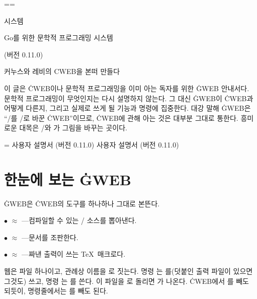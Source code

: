 \def\bull{\smallskip\item{$\bullet$}}

\def\begincode{\par\medskip\begingroup
  \def\do##1{\catcode`##1=12 }\dospecials
  \catcode`\|=0
  \obeylines \obeyspaces \tt \parindent=0pt \leftskip=\parindent\relax}
\def\endcode{\endgroup\medskip\noindent}

\def\runninghead{{\ninett GWEB} 사용자 설명서 (버전 0.11.0)}
\def\lheader{\mainfont\folio\hfil{\eightrm\eightgt\runninghead}\hfil}
\def\rheader{\hfil{\eightrm\eightgt\runninghead}\hfil\mainfont\folio}

\headline={\hfil}\footline={\hfil}
\null\vfill
\centerline{ 시스템}
\vskip 6pt
\centerline{\chapterfont Go를 위한 문학적 프로그래밍 시스템}
\vskip 18pt
\centerline{(버전 0.11.0)}
\vskip 24pt
\centerline{\authorfont 커누스와 레비의 {\ttitlefont CWEB}을 본떠 만들다}
\vfill
\noindent
이 글은 \.{CWEB}이나 문학적 프로그래밍을 이미 아는 독자를 위한 \.{GWEB}
안내서다. 문학적 프로그래밍이 무엇인지는 다시 설명하지 않는다. 그 대신
\.{GWEB}이 \.{CWEB}과 어떻게 다른지, 그리고 실제로 쓰게 될 기능과 명령에
집중한다. 대강 말해 \.{GWEB}은 ``\CEE/를 \GO/로 바꾼 \.{CWEB}''이므로,
\.{CWEB}에 관해 아는 것은 대부분 그대로 통한다. 흥미로운 대목은 \GO/와
가 그림을 바꾸는 곳이다.
\vfil\eject

\headline={\ifodd\pageno\rheader\else\lheader\fi}

\chapter{한눈에 보는 \.{GWEB}}
\noindent\.{GWEB}은 \.{CWEB}의 도구를 하나하나 그대로 본뜬다.

\bull {} $\approx$ ---컴파일할 수 있는 \GO/ 소스를 뽑아낸다.

\bull {} $\approx$ ---문서를 조판한다.

\bull {} $\approx$ ---짜낸 출력이 쓰는 \TeX\ 매크로다.

\noindent 웹은 파일 하나이고, 관례상 이름을 로 짓는다. 명령
는 를(덧붙인 출력 파일이 있으면 그것도) 쓰고, 명령
는 를 쓴다. 이 파일을 로 돌리면
가 나온다. \.{CWEB}에서 를 빼도 되듯이, 명령줄에서는 를
빼도 된다.

